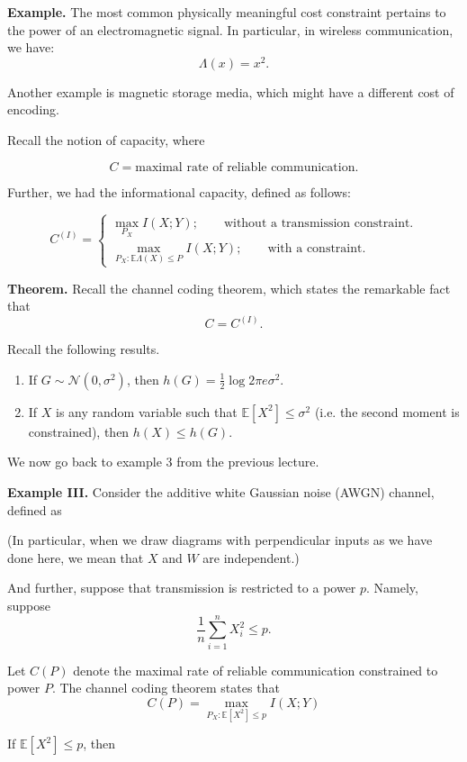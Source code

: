 \documentclass[13pt]{article}
\newcommand{\EE}{\mathbb{E}}
\newcommand{\NN}{\mathcal{N}}
\begin{document}
{\bf Example.} The most common physically meaningful cost constraint pertains to the power of an electromagnetic signal.  In particular, in wireless communication, we have:
\[
  \Lambda (x) = x^2.
\]

Another example is magnetic storage media, which might have a different cost of encoding.

Recall the notion of capacity, where

\[
  C = \text{maximal rate of reliable communication}.
\]

Further, we had the informational capacity, defined as follows:

\[
  C^{(I)} = 
  \begin{cases}
  \displaystyle \max_{P_X} I(X; Y); \qquad \text{without a transmission constraint.} \\
  \displaystyle \max_{P_X: \EE \Lambda(X) \leq P} I(X; Y); \qquad \text{with a constraint.}  
  \end{cases}
\]

{\bf Theorem.} Recall the channel coding theorem, which states the remarkable fact that
\[
  C = C^{(I)}.
\]

Recall the following results.

\begin{enumerate}
  \item If $G \sim \NN (0, \sigma^2)$, then $h(G) = \frac{1}{2} \log 2 \pi e \sigma^2$.
  \item If $X$ is any random variable such that $\EE [X^2] \leq \sigma^2$ (i.e. the second moment is constrained), then $h(X) \leq h(G)$.
\end{enumerate}

We now go back to example 3 from the previous lecture.

{\bf Example III.}  Consider the additive white Gaussian noise (AWGN) channel, defined as


(In particular, when we draw diagrams with perpendicular inputs as we have done here, we mean that $X$ and $W$ are independent.)

And further, suppose that transmission is restricted to a power $p$.   Namely, suppose
\[
  \frac{1}{n} \sum_{i=1}^{n} X_i^2 \leq p.
\]

Let $C(P)$ denote the maximal rate of reliable communication constrained to power $P$.  The channel coding theorem states that
\[
  C(P) = \max_{P_X: \EE [X^2] \leq p} I(X; Y)
\]

If $\EE[X^2] \leq p$, then
\end{document}
